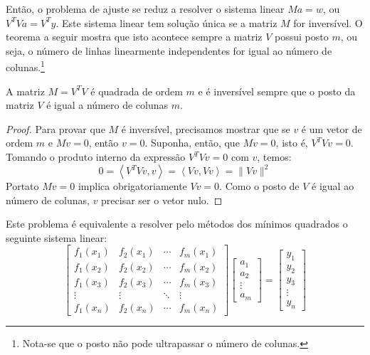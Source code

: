 Então, o problema de ajuste se reduz a resolver o sistema linear $Ma=w$, ou $V^TVa = V^T y$. Este sistema linear tem solução única se a matriz $M$ for inversível. O teorema a seguir mostra que isto acontece sempre a matriz $V$ possui posto $m$, ou seja, o número de linhas linearmente independentes for igual ao número de colunas.\footnote{Nota-se que o posto não pode ultrapassar o número de colunas.}


\begin{teo}
A matriz $M=V^TV$ é quadrada de ordem $m$ e é inversível sempre que o posto da matriz $V$ é igual a número de colunas $m$.
\end{teo}
\begin{proof}
Para provar que $M$ é inversível, precisamos mostrar que se $v$ é um vetor de ordem $m$ e $Mv=0$, então $v=0$. Suponha, então, que $Mv=0$, isto é, 
$V^TVv=0$. Tomando o produto interno da expressão $V^TVv=0$ com $v$, temos:
$$0=\left<V^TVv,v\right>=\left<Vv,Vv\right>=\|Vv\|^2$$
Portato $Mv=0$ implica obrigatoriamente $Vv=0$. Como o posto de $V$ é igual ao número de colunas, $v$ precisar ser o vetor nulo.
\end{proof}

\begin{obs} Este problema é equivalente a resolver pelo métodos dos mínimos quadrados o seguinte sistema linear:
  \begin{equation*}
    \begin{bmatrix}
      f_1(x_1)&f_2(x_1) & \cdots & f_m(x_1)\\
      f_1(x_2)&f_2(x_2) & \cdots & f_m(x_2)\\
      f_1(x_3)&f_2(x_3) & \cdots & f_m(x_3)\\
      \vdots & \vdots & \ddots & \vdots\\
      f_1(x_n)&f_2(x_n) & \cdots & f_m(x_n)
    \end{bmatrix}
    \begin{bmatrix}
      a_1\\
      a_2\\
      \vdots\\
      a_m
    \end{bmatrix}
    =\begin{bmatrix}
      y_1\\
      y_2\\
      y_3\\
      \vdots\\
      y_n
    \end{bmatrix}
  \end{equation*}
\end{obs}

